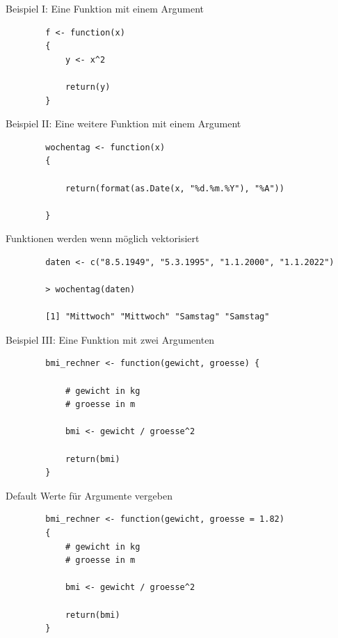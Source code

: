 \documentclass[xcolor=dvipsnames, aspectratio = 169]{beamer}
\begin{document}
\begin{frame}[fragile]{Beispiel I: Eine Funktion mit einem Argument}
    \begin{verbatim}
        f <- function(x)
        {
            y <- x^2
            
            return(y)
        }
    \end{verbatim}
\end{frame}

\begin{frame}[fragile]{Beispiel II: Eine weitere Funktion mit einem Argument}
    \begin{verbatim}
        wochentag <- function(x) 
        {
            
            return(format(as.Date(x, "%d.%m.%Y"), "%A"))
            
        }
    \end{verbatim}
\end{frame}

\begin{frame}[fragile]{Funktionen werden wenn möglich vektorisiert}
    \begin{verbatim}
        daten <- c("8.5.1949", "5.3.1995", "1.1.2000", "1.1.2022")
        
        > wochentag(daten)
        
        [1] "Mittwoch" "Mittwoch" "Samstag" "Samstag"
    \end{verbatim}
\end{frame}

\begin{frame}[fragile]{Beispiel III: Eine Funktion mit zwei Argumenten}
    \begin{verbatim}
        bmi_rechner <- function(gewicht, groesse) {
            
            # gewicht in kg
            # groesse in m
            
            bmi <- gewicht / groesse^2
            
            return(bmi)
        }
    \end{verbatim}
\end{frame}

\begin{frame}[fragile]{Default Werte für Argumente vergeben}
        \begin{verbatim}
        bmi_rechner <- function(gewicht, groesse = 1.82) 
        {
            # gewicht in kg
            # groesse in m
            
            bmi <- gewicht / groesse^2
            
            return(bmi)
        }
    \end{verbatim}
\end{frame}
\end{document}

